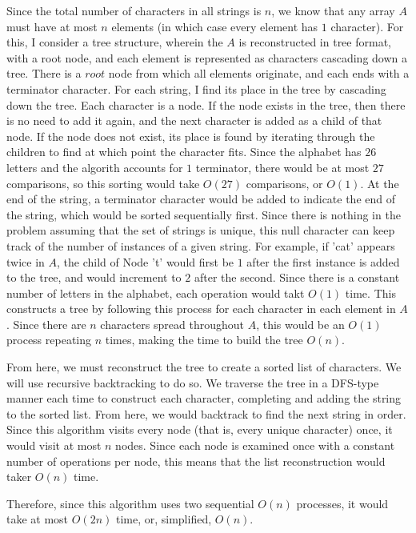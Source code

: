 \documentclass[11pt]{article}
\begin{document}
Since the total number of characters in all strings is $n$, we know that any array $A$ must have at most $n$ elements 
(in which case every element has $1$ character). 
For this, I consider a tree structure, wherein the $A$ is reconstructed in tree format, with a root node, 
and each element is represented as characters cascading down a tree. 
There is a $root$ node from which all elements originate, and each ends with a terminator character. 
For each string, I find its place in the tree by cascading down the tree. Each character is a node. 
If the node exists in the tree, then there is no need to add it again, and the next character is added as a child of that node. 
If the node does not exist, its place is found by iterating through the children to find at which point the character fits. 
Since the alphabet has $26$ letters and the algorith accounts for $1$ terminator, 
there would be at most $27$ comparisons, so this sorting would take $O(27)$ comparisons, or $O(1)$. 
At the end of the string, a terminator character would be added to indicate the end of the string, 
which would be sorted sequentially first. Since there is nothing in the problem assuming that the set of strings is unique, 
this null character can keep track of the number of instances of a given string. 
For example, if 'cat' appears twice in $A$, the child of Node 't' would first be $1$ after the first instance is added to the tree, 
and would increment to $2$ after the second. Since there is a constant number of letters in the alphabet, 
each operation would takt $O(1)$ time. This constructs a tree by following this process for each character in each element in $A$. 
Since there are $n$ characters spread throughout $A$, this would be an $O(1)$ process repeating $n$ times, 
making the time to build the tree $O(n)$.

From here, we must reconstruct the tree to create a sorted list of characters. We will use recursive backtracking to do so. 
We traverse the tree in a DFS-type manner each time to construct each character, completing and adding the string to the sorted list. 
From here, we would backtrack to find the next string in order. 
Since this algorithm visits every node (that is, every unique character) once, it would visit at most $n$ nodes. 
Since each node is examined once with a constant number of operations per node, this means that the list reconstruction would taker $O(n)$ time. 

Therefore, since this algorithm uses two sequential $O(n)$ processes, it would take at most $O(2n)$ time, or, simplified, $O(n)$.
\end{document}
